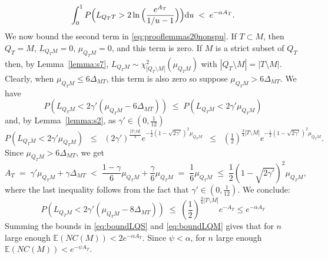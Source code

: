 \documentclass[aos]{imsart}
\theoremstyle{plain}
\newcommand{\E}{\mathbb{E}}
\begin{document}
\begin{equation}\label{eq:boundLQS}
\int_0^1P\Bigl(L_{Q_TT}>2\ln{\Bigl(\frac{e^{A_T}}{1 / u-1}\Bigl)}\Bigl){\rm d}u \;<\; 
e^{-\alpha A_T}.
\end{equation}
We now bound the second term in \eqref{eq:prooflemmas20nonspu}. If $T \subset M$, then $Q_T=M$, $L_{Q_TM}=0$, $\mu_{Q_TM}=0$, and this term is zero. If $M$ is a strict subset of $Q_T$ then, by Lemma~\ref{lemma:s7}, $L_{Q_TM} \sim \chi_{|Q_T\setminus M|}^2(\mu_{Q_TM})$ with $|Q_T\setminus M|=|T\setminus M|$.
Clearly, when $\mu_{Q_TM}\leq 6\Delta_{MT}$, this term is also zero so suppose  $\mu_{Q_TM}> 6\Delta_{MT}$.  
We have  
$$P\left(L_{Q_TM}<2\gamma'(\mu_{Q_TM}-6\Delta_{MT})\right)\; \leq \; P\left(L_{Q_TM}<2\gamma'\mu_{Q_TM}\right)$$ 
and, by Lemma~\ref{lemma:s2}, as $\gamma'\in (0,\tfrac{1}{12})$
$$P\left(L_{Q_TM}<2\gamma'\mu_{Q_TM}\right) \;\;\leq\;\; (2\gamma')^{\frac{|T\setminus M|}{4}} e^{-\frac{1}{2}(1-\sqrt{2\gamma'})^2\mu_{Q_TM}}\;\;\leq\;\;  (\tfrac12)^{\tfrac34|T\setminus M|}e^{-\frac{1}{2}(1-\sqrt{2\gamma'})^2\mu_{Q_TM}}.$$
Since $\mu_{Q_TM}>6\Delta_{MT}$, we get
$$
A_T\;=\;\gamma'\mu_{Q_TM}+\gamma\Delta_{MT}\;<\;\frac{1-\gamma}{6}\mu_{Q_TM}+\frac{\gamma}{6}\mu_{Q_TM}\;=\;\frac16\mu_{Q_TM}\;\leq\;\frac12(1-\sqrt{2\gamma'})^2\mu_{Q_TM},
$$
where the last inequality follows from the fact that $\gamma'\in(0, \tfrac{1}{12})$. We conclude:
\begin{equation}\label{eq:boundLQM}
    P\left(L_{Q_TM}<2\gamma'(\mu_{Q_TM}-8\Delta_{MT})\right) \;\leq\; \left(\frac12\right)^{\tfrac34|T\setminus M|}e^{-A_T} \leq e^{-\alpha A_T}
\end{equation}
Summing the bounds in \eqref{eq:boundLQS} and \eqref{eq:boundLQM} gives that for $n$ large enough $\E\left(NC(M)\right) < 2e^{-\alpha A_T}$. Since $\psi<\alpha$, for $n$ large enough $\E\left(NC(M)\right) < e^{-\psi A_T}$.
\end{document}
